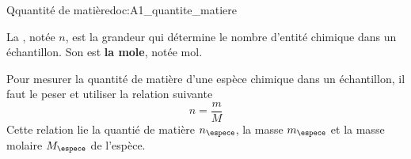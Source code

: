 

\begin{doc}{Qquantité de matière}{doc:A1_quantite_matiere}
  \begin{encart}
    La , notée $n$, est la grandeur qui détermine le nombre d'entité chimique dans un échantillon.
    Son  est \textbf{la mole}, notée \unit{\mole}.
  \end{encart}

  Pour mesurer la quantité de matière d'une espèce chimique dans un échantillon,
  il faut le peser et utiliser la relation suivante
  \begin{equation*}
    n = \dfrac{m}{M}
  \end{equation*}
  Cette relation lie la quantié de matière $n_\espece$, la masse $m_\espece$ et la masse molaire $M_\espece$ de l'espèce.
\end{doc}

